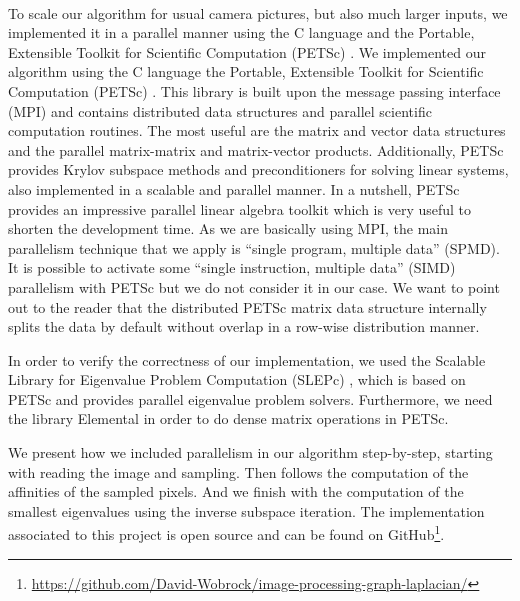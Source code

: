 \paragraph{}
\ifthesis
 To scale our algorithm for usual camera pictures, but also much larger inputs, we implemented it in a parallel manner using the C language and the Portable, Extensible Toolkit for Scientific Computation (PETSc) \cite{petsc_web_page}.
\else
 We implemented our algorithm using the C language the Portable, Extensible Toolkit for Scientific Computation (PETSc) \cite{petsc_web_page}.
\fi
This library is built upon the message passing interface (MPI) and contains distributed data structures and parallel scientific computation routines.
\ifthesis
 The most useful are the matrix and vector data structures and the parallel matrix-matrix and matrix-vector products.
 Additionally, PETSc provides Krylov subspace methods and preconditioners for solving linear systems, also implemented in a scalable and parallel manner.
 In a nutshell, PETSc provides an impressive parallel linear algebra toolkit which is very useful to shorten the development time.
 As we are basically using MPI, the main parallelism technique that we apply is ``single program, multiple data'' (SPMD).
 It is possible to activate some ``single instruction, multiple data'' (SIMD) parallelism with PETSc but we do not consider it in our case.
 We want to point out to the reader that the distributed PETSc matrix data structure internally splits the data by default without overlap in a row-wise distribution manner.

 In order to verify the correctness of our implementation, we used the Scalable Library for Eigenvalue Problem Computation (SLEPc) \cite{hernandez_slepc_2005}, which is based on PETSc and provides parallel eigenvalue problem solvers.
 Furthermore, we need the library Elemental \cite{poulson_elemental_2013} in order to do dense matrix operations in PETSc.
\fi

\ifthesis
 We present how we included parallelism in our algorithm step-by-step, starting with reading the image and sampling.
 Then follows the computation of the affinities of the sampled pixels.
 And we finish with the computation of the smallest eigenvalues using the inverse subspace iteration.
\fi
The implementation associated to this project is open source and can be found on GitHub\footnote{\url{https://github.com/David-Wobrock/image-processing-graph-laplacian/}}.
